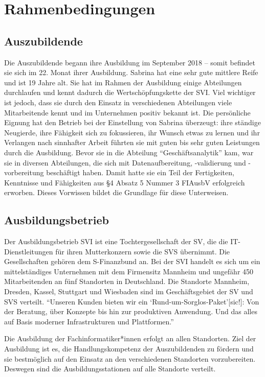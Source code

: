 \chapter{Rahmenbedingungen}

\section{Auszubildende}
Die Auszubildende \Azubi begann ihre Ausbildung im September 2018 -- somit befindet sie sich im 22. Monat ihrer Ausbildung. Sabrina hat eine sehr gute mittlere Reife und ist 19 Jahre alt. Sie hat im Rahmen der Ausbildung einige Abteilungen durchlaufen und kennt dadurch die Wertschöpfungskette der \ac{SVI}. Viel wichtiger ist jedoch, dass sie durch den Einsatz in verschiedenen Abteilungen viele Mitarbeitende kennt und im Unternehmen positiv bekannt ist. Die persönliche Eignung hat den Betrieb bei der Einstellung von Sabrina überzeugt: ihre ständige Neugierde, ihre Fähigkeit sich zu fokussieren, ihr Wunsch etwas zu lernen und ihr Verlangen nach sinnhafter Arbeit führten sie mit guten bis sehr guten Leistungen durch die Ausbildung. Bevor sie in die Abteilung \enquote{Geschäftsanalytik} kam, war sie in diversen Abteilungen, die sich mit Datenaufbereitung, -validierung und -vorbereitung beschäftigt haben. Damit hatte sie ein Teil der Fertigkeiten, Kenntnisse und Fähigkeiten aus §4 Absatz 5 Nummer 3 \ac{FIAusbV} erfolgreich erworben. Dieses Vorwissen bildet die Grundlage für diese Unterweisen.

\section{Ausbildungsbetrieb}
Der Ausbildungsbetrieb \ac{SVI} ist eine Tochtergesellschaft der \ac{SV}, die die IT-Dienstleitungen für ihren Mutterkonzern sowie die \ac{SVS} übernimmt. Die Gesellschaften gehören dem S-Finanzbund an. Bei der \ac{SVI} handelt es sich um ein mittelständiges Unternehmen mit dem Firmensitz Mannheim und ungefähr 450 Mitarbeitenden\autocite[vgl.][]{sv_informatik_gmbg_uber_2020} an fünf Standorten in Deutschland. Die Standorte Mannheim, Dresden, Kassel, Stuttgart und Wiesbaden sind im Geschäftsgebiet der \ac{SV} und \ac{SVS} verteilt. \enquote{Unseren Kunden bieten wir ein \enquote{Rund-um-Sorglos-Paket}[sic!]: Von der Beratung, über Konzepte bis hin zur produktiven Anwendung. Und das alles auf Basis moderner Infrastrukturen und Plattformen.}\autocite{sv_informatik_gmbg_uber_2020}
\par
Die Ausbildung der Fachinformatiker*innen erfolgt an allen Standorten. Ziel der Ausbildung ist es, die Handlungskompetenz der Auszubildenden zu fördern und sie bestmöglich auf den Einsatz an den verschiedenen Standorten vorzubereiten. Deswegen sind die Ausbildungsstationen auf alle Standorte verteilt.

